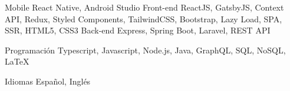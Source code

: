 

\begin{cvskills}


  \cvskill
    {Mobile} %
    {React Native, Android Studio} %
  \cvskill
    {Front-end} %
    {ReactJS, GatsbyJS, Context API, Redux, Styled Components, TailwindCSS, Bootstrap, Lazy Load, SPA, SSR, HTML5, CSS3} %
  \cvskill
    {Back-end} %
    {Express, Spring Boot, Laravel, REST API} %


  \cvskill
    {Programación} %
    {Typescript, Javascript, Node.js, Java, GraphQL, SQL, NoSQL, LaTeX} %

  \cvskill
    {Idiomas} %
    {Español, Inglés} %

\end{cvskills}
